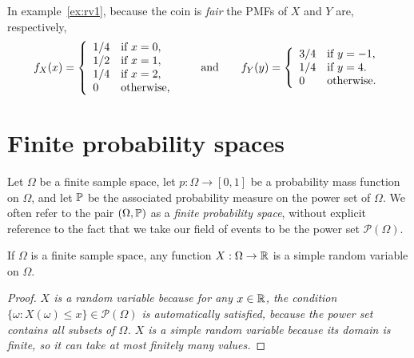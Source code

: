 
\begin{example}
In example~\ref{ex:rv1}, because the coin is \emph{fair} the PMFs of $X$ and $Y$ are, respectively,
\[
f_X(x) = 
\left\{\begin{array}{ll}
1/4	& \text{if }x = 0, \\
1/2	& \text{if }x = 1, \\
1/4 & \text{if }x = 2, \\
0	& \text{otherwise,}
\end{array}\right.
\text{\qquad and\qquad}
f_Y(y) = 
\left\{\begin{array}{ll}
3/4	& \text{if }y = -1, \\
1/4	& \text{if }y = 4. \\
0	& \text{otherwise.}
\end{array}\right.
\]
\end{example}

\section{Finite probability spaces}
Let $\Omega$ be a finite sample space, let $p:\Omega\to [0,1]$ be a probability mass function on $\Omega$, and let $\mathbb{P}$ be the associated probability measure on the power set of $\Omega$. We often refer to the pair $(\Omega,\mathbb{P})$ as a \emph{finite probability space}, without explicit reference to the fact that we take our field of events to be the power set $\mathcal{P}(\Omega)$.


\begin{lemma}
If $\Omega$ is a finite sample space, any function $X:\Omega\to\mathbb{R}$ is a simple random variable on $\Omega$.
\end{lemma}

\begin{proof}
\bit
\it $X$ is a random variable because for any $x\in\mathbb{R}$, the condition $\{\omega:X(\omega)\leq x\} \in \mathcal{P}(\Omega)$ is automatically satisfied, because the power set contains \emph{all} subsets of $\Omega$.
\it $X$ is a simple random variable because its domain is finite, so it can take at most finitely many values.
\eit
\end{proof}

